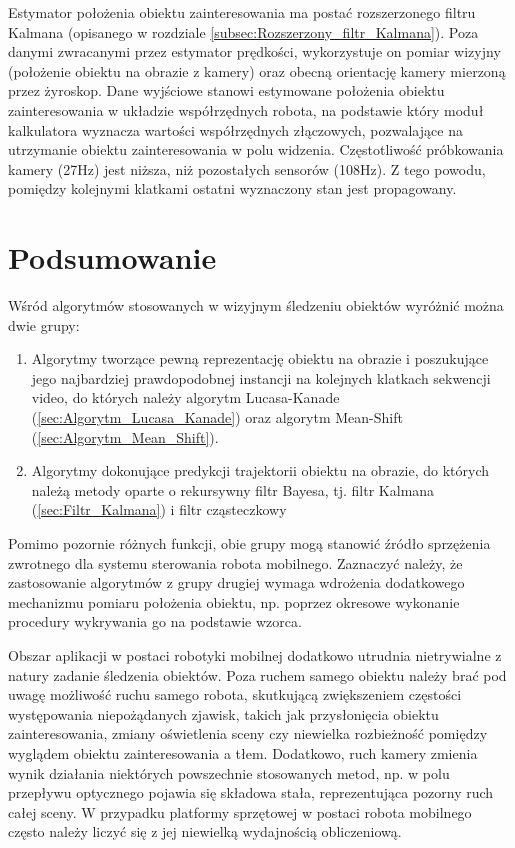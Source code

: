 {Estymator położenia obiektu zainteresowania ma postać rozszerzonego filtru Kalmana (opisanego w rozdziale \ref{subsec:Rozszerzony_filtr_Kalmana}). Poza danymi zwracanymi przez estymator prędkości, wykorzystuje on pomiar wizyjny (położenie obiektu na obrazie z kamery) oraz obecną orientację kamery mierzoną przez żyroskop. Dane wyjściowe stanowi estymowane położenia obiektu zainteresowania w układzie współrzędnych robota, na podstawie który moduł kalkulatora wyznacza wartości współrzędnych złączowych, pozwalające na utrzymanie obiektu zainteresowania w polu widzenia. Częstotliwość próbkowania kamery (27Hz) jest niższa, niż pozostałych sensorów (108Hz). Z tego powodu, pomiędzy kolejnymi klatkami ostatni wyznaczony stan jest propagowany.


\section{Podsumowanie}
\label{sec:Przyklady_podsumowanie}


Wśród algorytmów stosowanych w wizyjnym śledzeniu obiektów wyróżnić można dwie grupy:

\begin{enumerate}
	\item Algorytmy tworzące pewną reprezentację obiektu na obrazie i poszukujące jego najbardziej prawdopodobnej instancji na kolejnych klatkach sekwencji video, do których należy algorytm Lucasa-Kanade (\ref{sec:Algorytm_Lucasa_Kanade}) oraz algorytm Mean-Shift (\ref{sec:Algorytm_Mean_Shift}).
	\item Algorytmy dokonujące predykcji trajektorii obiektu na obrazie, do których należą metody oparte o rekursywny filtr Bayesa, tj. filtr Kalmana (\ref{sec:Filtr_Kalmana}) i filtr cząsteczkowy
\end{enumerate}

Pomimo pozornie różnych funkcji, obie grupy mogą stanowić źródło sprzężenia zwrotnego dla systemu sterowania robota mobilnego. Zaznaczyć należy, że zastosowanie algorytmów z grupy drugiej wymaga wdrożenia dodatkowego mechanizmu  pomiaru położenia obiektu, np. poprzez okresowe wykonanie procedury wykrywania go na podstawie wzorca.

Obszar aplikacji w postaci robotyki mobilnej dodatkowo utrudnia nietrywialne z natury zadanie śledzenia obiektów. Poza ruchem samego obiektu należy brać pod uwagę możliwość ruchu samego robota, skutkującą zwiększeniem częstości występowania niepożądanych zjawisk, takich jak przysłonięcia obiektu zainteresowania, zmiany oświetlenia sceny czy niewielka rozbieżność pomiędzy wyglądem obiektu zainteresowania a tłem. Dodatkowo, ruch kamery zmienia wynik działania niektórych powszechnie stosowanych metod, np. w polu przepływu optycznego pojawia się składowa stała, reprezentująca pozorny ruch całej sceny. W przypadku platformy sprzętowej w postaci robota mobilnego często należy liczyć się z jej niewielką wydajnością obliczeniową.

}
